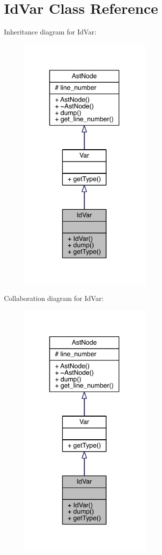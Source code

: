 \hypertarget{class_id_var}{}\section{Id\+Var Class Reference}
\label{class_id_var}


Inheritance diagram for Id\+Var\+:\nopagebreak
\begin{figure}[H]
\begin{center}
\leavevmode
\includegraphics[width=186pt]{class_id_var__inherit__graph}
\end{center}
\end{figure}


Collaboration diagram for Id\+Var\+:\nopagebreak
\begin{figure}[H]
\begin{center}
\leavevmode
\includegraphics[width=186pt]{class_id_var__coll__graph}
\end{center}
\end{figure}
